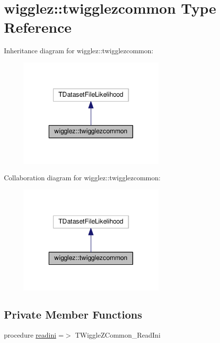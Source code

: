 \hypertarget{structwigglez_1_1twigglezcommon}{}\section{wigglez\+:\+:twigglezcommon Type Reference}
\label{structwigglez_1_1twigglezcommon}


Inheritance diagram for wigglez\+:\+:twigglezcommon\+:
\nopagebreak
\begin{figure}[H]
\begin{center}
\leavevmode
\includegraphics[width=208pt]{structwigglez_1_1twigglezcommon__inherit__graph}
\end{center}
\end{figure}


Collaboration diagram for wigglez\+:\+:twigglezcommon\+:
\nopagebreak
\begin{figure}[H]
\begin{center}
\leavevmode
\includegraphics[width=208pt]{structwigglez_1_1twigglezcommon__coll__graph}
\end{center}
\end{figure}
\subsection*{Private Member Functions}
\begin{DoxyCompactItemize}
\item 
procedure \mbox{\hyperlink{structwigglez_1_1twigglezcommon_ac47c6f73ef413629e4f3799fceddb072}{readini}} =$>$ T\+Wiggle\+Z\+Common\+\_\+\+Read\+Ini
\end{DoxyCompactItemize}


